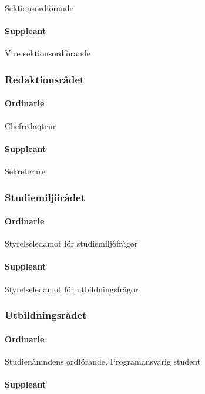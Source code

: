 \documentclass{dgovdoc}
\begin{document}
Sektionsordförande

\paragraph{Suppleant}

Vice sektionsordförande

\subsubsection{Redaktionsrådet}

\paragraph{Ordinarie}

Chefredaqteur

\paragraph{Suppleant}

Sekreterare

\subsubsection{Studiemiljörådet}

\paragraph{Ordinarie}

Styrelseledamot för studiemiljöfrågor

\paragraph{Suppleant}

Styrelseledamot för utbildningsfrågor

\subsubsection{Utbildningsrådet}

\paragraph{Ordinarie}

Studienämndens ordförande, Programansvarig student

\paragraph{Suppleant}
\end{document}
